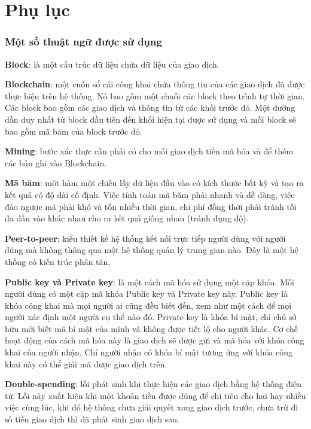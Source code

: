 
\chapter*{Phụ lục} %
\subsection{Một số thuật ngữ được sử dụng}
\textbf{Block}: là một cấu trúc dữ liệu chứa dữ liệu của giao dịch.

\textbf{Blockchain}: một cuốn sổ cái công khai chứa thông tin của các giao dịch đã được thực hiện trên hệ thống. Nó bao gồm một chuỗi các block theo trình tự thời gian. Các block bao gồm các giao dịch và thông tin từ các khối trước đó. Một đường dẫn duy nhất từ block đầu tiên đến khối hiện tại được sử dụng và mỗi block sẽ bao gồm mã băm của block trước đó.

\textbf{Mining}: bước xác thực cần phải có cho mỗi giao dịch tiền mã hóa và để thêm các bản ghi vào Blockchain.

\textbf{Mã băm}: một hàm một chiều lấy dữ liệu đầu vào có kích thước bất kỳ và tạo ra kết quả có độ dài cố định. Việc tính toán mã băm phải nhanh và dễ dàng, việc đảo ngược mã phải khó và tốn nhiều thời gian, chi phí đồng thời phải tránh tối đa đầu vào khác nhau cho ra kết quả giống nhau (tránh đụng độ).

\textbf{Peer-to-peer}: kiểu thiết kế hệ thống kết nối trực tiếp người dùng với người dùng mà không
thông qua một hệ thống quản lý trung gian nào. Đây là một hệ thống có kiến trúc phân tán.

\textbf{Public key và Private key}: là một cách mã hóa sử dụng một cặp khóa. Mỗi người dùng có một cặp mã khóa Public key và Private key này. Public key là khóa công khai mà mọi người ai cũng đều biết đến, xem như một cách để mọi người xác định một người cụ thể nào đó. Private key là khóa bí mật, chỉ chủ sở hữu mới biết mã bí mật của mình và không được tiết lộ cho người khác. Cơ chế hoạt động của cách mã hóa này là giao dịch sẽ được gửi và mã hóa với khóa công khai của người nhận. Chỉ người nhận có khóa bí mật tương ứng với khóa công khai này có thể giải mã được giao dịch trên.

\textbf{Double-spending}: lỗi phát sinh khi thực hiện các giao dịch bằng hệ thống điện tử. Lỗi này xuất hiện khi một khoản tiền được dùng để chi tiêu cho hai hay nhiều việc cùng lúc, khi đó hệ thống chưa giải quyết xong giao dịch trước, chưa trừ đi số tiền giao dịch thì đã
phát sinh giao dịch sau.

